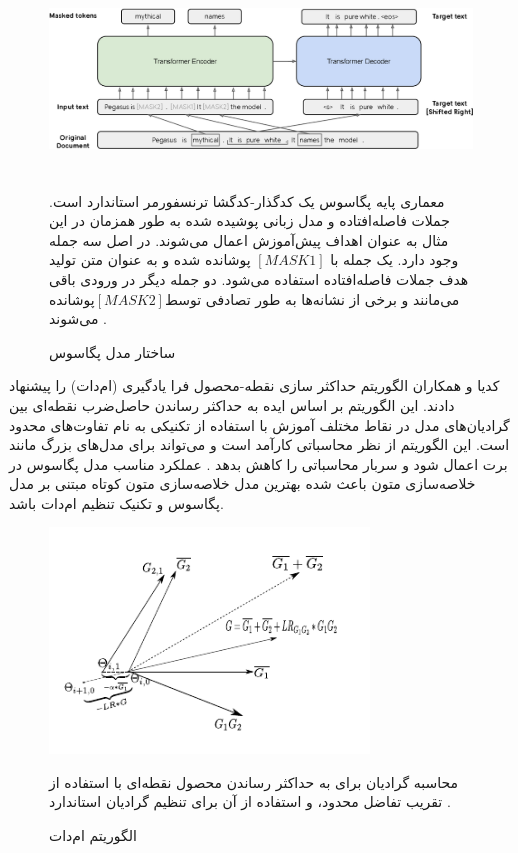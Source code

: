 \begin{figure}[!h]
	\begin{center}
		\includegraphics[height=5cm]{pegasus.png}
	\end{center}
	\caption{ ساختار مدل پگاسوس \cite{zhang2020pegasus}}
	\label{fig:pegasus}
	\medskip
	\small{
		معماری پایه پگاسوس یک کدگذار-کدگشا ترنسفورمر استاندارد است. جملات فاصله‌افتاده و مدل زبانی پوشیده شده به طور همزمان در این مثال به عنوان اهداف پيش‌آموزش اعمال می‌شوند. در اصل سه جمله وجود دارد. یک جمله با $ [MASK1] $ پوشانده شده و به عنوان متن تولید هدف جملات فاصله‌افتاده استفاده می‌شود. دو جمله دیگر در ورودی باقی می‌مانند و برخی از نشانه‌ها به طور تصادفی توسط$ [MASK2] $پوشانده می‌شوند
		\cite{zhang2020pegasus}.}
\end{figure}

کدیا
و همکاران الگوریتم حداکثر سازی نقطه-محصول فرا یادگیری (ام‌دات)
را پیشنهاد دادند. این الگوریتم بر اساس ایده به حداکثر رساندن حاصل‌ضرب نقطه‌ای بین گرادیان‌های مدل در نقاط مختلف آموزش با استفاده از تکنیکی به نام تفاوت‌های محدود
است. این الگوریتم از نظر محاسباتی کارآمد است و می‌تواند برای مدل‌های بزرگ مانند برت اعمال شود و سربار محاسباتی را کاهش بدهد
\cite{sherborne2023meta}.
عملکرد مناسب مدل پگاسوس در خلاصه‌سازی متون باعث شده بهترین مدل خلاصه‌سازی متون کوتاه مبتنی بر مدل پگاسوس و تکنیک تنظیم 
ام‌دات باشد.

\begin{figure}[!h]
	\begin{center}
		\includegraphics[height=6cm]{Mdot.png}
	\end{center}
	\caption{ الگوریتم ام‌دات \cite{sherborne2023meta}}
	\label{fig:Mdot}
	\medskip
	\small{
		محاسبه گرادیان برای به حداکثر رساندن محصول نقطه‌ای با استفاده از تقریب تفاضل محدود، و استفاده از آن برای تنظیم گرادیان استاندارد
		\cite{sherborne2023meta}.
	}
\end{figure}



